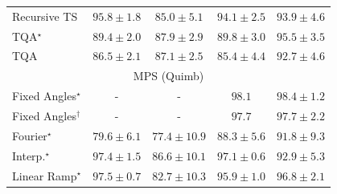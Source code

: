 \begin{tabular}{l|cccc|}
Recursive TS & {\cellcolor[HTML]{770C73}} \color[HTML]{F1F1F1} $95.8\pm 1.8$ & {\cellcolor[HTML]{8C93C4}} \color[HTML]{F1F1F1} $85.0\pm 5.1$ & {\cellcolor[HTML]{831F86}} \color[HTML]{F1F1F1} $94.1\pm 2.5$ & {\cellcolor[HTML]{842289}} \color[HTML]{F1F1F1} $93.9\pm 4.6$ \\
TQA$^\star$ & {\cellcolor[HTML]{8B5DAA}} \color[HTML]{F1F1F1} $89.4\pm 2.0$ & {\cellcolor[HTML]{8C70B3}} \color[HTML]{F1F1F1} $87.9\pm 2.9$ & {\cellcolor[HTML]{8A58A8}} \color[HTML]{F1F1F1} $89.8\pm 3.0$ & {\cellcolor[HTML]{7C0E78}} \color[HTML]{F1F1F1} $95.5\pm 3.5$ \\
TQA & {\cellcolor[HTML]{8C80BB}} \color[HTML]{F1F1F1} $86.5\pm 2.1$ & {\cellcolor[HTML]{8C79B8}} \color[HTML]{F1F1F1} $87.1\pm 2.5$ & {\cellcolor[HTML]{8C8FC2}} \color[HTML]{F1F1F1} $85.4\pm 4.4$ & {\cellcolor[HTML]{863394}} \color[HTML]{F1F1F1} $92.7\pm 4.6$ \\
\cline{1-5}
\multicolumn{5}{c}{\rule{0pt}{8pt}MPS (Quimb)} \\
\midrule
Fixed Angles$^\star$ & {\cellcolor[HTML]{000000}} \color[HTML]{F1F1F1} {\cellcolor{white}} \color{black} - & {\cellcolor[HTML]{000000}} \color[HTML]{F1F1F1} {\cellcolor{white}} \color{black} - & {\cellcolor[HTML]{6E2706}} \color[HTML]{F1F1F1} $98.1$ & {\cellcolor[HTML]{692606}} \color[HTML]{F1F1F1} $98.4\pm 1.2$ \\
Fixed Angles$^\dagger$ & {\cellcolor[HTML]{000000}} \color[HTML]{F1F1F1} {\cellcolor{white}} \color{black} - & {\cellcolor[HTML]{000000}} \color[HTML]{F1F1F1} {\cellcolor{white}} \color{black} - & {\cellcolor[HTML]{742905}} \color[HTML]{F1F1F1} $97.7$ & {\cellcolor[HTML]{742905}} \color[HTML]{F1F1F1} $97.7\pm 2.2$ \\
Fourier$^\star$ & {\cellcolor[HTML]{FED36F}} \color[HTML]{000000} $79.6\pm 6.1$ & {\cellcolor[HTML]{FEE596}} \color[HTML]{000000} $77.4\pm 10.9$ & {\cellcolor[HTML]{EB6F14}} \color[HTML]{F1F1F1} $88.3\pm 5.6$ & {\cellcolor[HTML]{CB4B02}} \color[HTML]{F1F1F1} $91.8\pm 9.3$ \\
Interp.$^\star$ & {\cellcolor[HTML]{782A05}} \color[HTML]{F1F1F1} $97.4\pm 1.5$ & {\cellcolor[HTML]{F5841E}} \color[HTML]{F1F1F1} $86.6\pm 10.1$ & {\cellcolor[HTML]{7C2C05}} \color[HTML]{F1F1F1} $97.1\pm 0.6$ & {\cellcolor[HTML]{BB4403}} \color[HTML]{F1F1F1} $92.9\pm 5.3$ \\
Linear Ramp$^\star$ & {\cellcolor[HTML]{782A05}} \color[HTML]{F1F1F1} $97.5\pm 0.7$ & {\cellcolor[HTML]{FEB23F}} \color[HTML]{000000} $82.7\pm 10.3$ & {\cellcolor[HTML]{8E3104}} \color[HTML]{F1F1F1} $95.9\pm 1.0$ & {\cellcolor[HTML]{812D05}} \color[HTML]{F1F1F1} $96.8\pm 2.1$ \\

\end{tabular}
